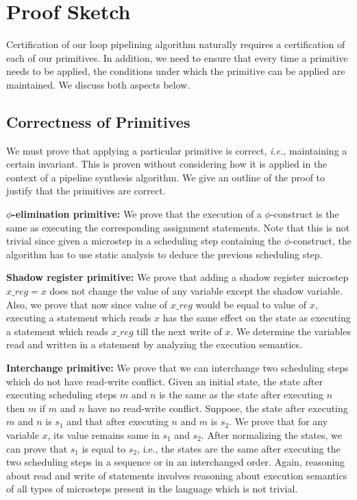 \chapter{Proof Sketch}
\label{sec:proof}

Certification of our loop pipelining algorithm naturally requires a certification of each of our primitives.
In addition, we need to ensure that every time a primitive needs to be applied, the conditions
under which the primitive can be applied are maintained. We discuss both aspects below.

\section{Correctness of Primitives}
We must prove that
 applying a particular primitive is correct, {\em i.e.},
  maintaining a certain invariant.  This is proven without
  considering how it is applied in the context of a pipeline
  synthesis algorithm. We give an outline of the proof to justify that the primitives are correct.

{\bf $\phi$-elimination primitive:} We prove that the execution
  of a $\phi$-construct is the same as executing the corresponding
  assignment statements. Note that this is not trivial since
  given a microstep in a scheduling step containing the
  $\phi$-construct, the algorithm has to use static analysis
  to deduce the previous scheduling step.

{\bf Shadow register primitive:} We prove that adding
  a shadow register microstep $x\_reg = x$ does not change the
  value of any variable except the shadow variable. Also, we
  prove that now since value of $x\_reg$ would be equal to value
  of $x$, executing a statement which reads $x$ has the same
  effect on the state as executing a statement which reads
  $x\_reg$ till the next write of $x$. We
  determine the variables read and written in a statement by
  analyzing the execution semantics.

{\bf Interchange primitive:} We prove that we can interchange two scheduling steps which do not have
  read-write conflict. Given an initial state, the state after
  executing scheduling steps $m$ and $n$ is the same as the state after
  executing $n$ then $m$ if $m$ and $n$ have no read-write
  conflict. Suppose, the state after
  executing $m$ and $n$ is $s_1$ and that after executing $n$ and
  $m$ is $s_2$. We prove that for any variable $x$, its
  value remains same in $s_1$ and $s_2$. After normalizing
  the states, we can prove that $s_1$ is equal to $s_2$, i.e.,
  the states are the same after executing the two scheduling steps in
  a sequence or in an interchanged order. Again, reasoning about read and
  write of statements involves reasoning about execution
  semantics of all types of microsteps present in the
  language which is not trivial.

